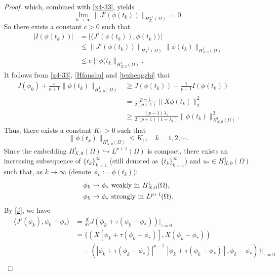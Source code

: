 \documentclass[11pt,a4paper]{article}
\numberwithin{equation}{section}
\numberwithin{remark}{section}
\begin{document}
\begin{proof}
which, combined with \eqref{x4-33}, yields
\begin{equation}\label{x6-33}
\lim_{k\rightarrow\infty}\|J'(\phi(t_k))\|_{H_X^{-1}(\Omega)}=0.
\end{equation}
So there exists a constant $c>0$ such that
\begin{equation*}
\begin{split}
|I(\phi(t_k))|&=|\langle J'(\phi(t_k)),\phi(t_k)\rangle|\\
&\leq\|J'(\phi(t_k))\|_{H_X^{-1}(\Omega)}\|\phi(t_k)\|_{H_{X,0}^1(\Omega)}\\
&\leq c\|\phi(t_k\|_{H_{X,0}^1(\Omega)}.
\end{split}
\end{equation*}
It follows from \eqref{x4-33}, \eqref{Hfanshu} and \eqref{tezhengzhi} that
\begin{equation*}
\begin{split}
J(\phi_0)+\frac{c}{p+1}\|\phi(t_k)\|_{H_{X,0}^1(\Omega)}&\geq J(\phi(t_k))-\frac{1}{p+1}I(\phi(t_k))\\
&=\frac{p-1}{2(p+1)}\|X\phi(t_k)\|_2^2\\
&\geq\frac{(p-1)\lambda_1}{2(p+1)(1+\lambda_1)}\|\phi(t_k)\|_{H_{X,0}^1(\Omega)}^2.
\end{split}
\end{equation*}
Thus, there exists a constant $K_1>0$ such that
\begin{equation}\label{x8-33}
\|\phi(t_k)\|_{H_{X,0}^1(\Omega)}\leq K_1, \quad k=1,2,\cdots.
\end{equation}
Since the embedding $H_{X,0}^1(\Omega)\hookrightarrow L^{p+1}(\Omega)$ is compact, there exists an increasing subsequence of $\{t_k\}_{k=1}^\infty$ (still denoted as $\{t_k\}_{k=1}^\infty$) and $u_*\in H_{X,0}^1(\Omega)$ such that, as $k\rightarrow\infty$ (denote $\phi_k:=\phi(t_k)$):
\begin{align}
&\phi_k\rightharpoonup \phi_* \hbox{ weakly in } H_{X,0}^1(\Omega),\label{x9-33}\\
&\phi_k\rightarrow \phi_* \hbox{ strongly in } L^{p+1}(\Omega).\label{x10-33}
\end{align}
By \eqref{J}, we have
\begin{equation*}
\begin{split}
\quad\langle J'(\phi_k),\phi_k-\phi_*\rangle&=\frac{d}{d\tau}J(\phi_k+\tau (\phi_k-\phi_*))\bigg|_{\tau=0}\\
&=\big\{\left(X[\phi_k+\tau(\phi_k-\phi_*)],X(\phi_k-\phi_*)\right)\\
&\quad-\left(|\phi_k+\tau(\phi_k-\phi_*)|^{p-1}[\phi_k+\tau(\phi_k-\phi_*)],\phi_k-\phi_*\right)\big\}\big|_{\tau=0}\\

\end{split}
\end{equation*}
\end{proof}
\end{document}
